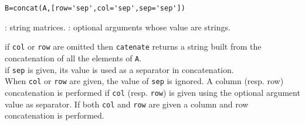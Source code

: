 
\begin{mandesc}
\end{mandesc}

\begin{calling_sequence}
\begin{verbatim}
B=concat(A,[row='sep',col='sep',sep='sep'])
\end{verbatim}
\end{calling_sequence}
\begin{parameters}
  \begin{varlist}
     : string matrices.
     : optional arguments whose value are strings.
  \end{varlist}
\end{parameters}

\begin{mandescription} 
  if \verb+col+ or \verb+row+ are omitted then \verb+catenate+
  returns a string built from the concatenation of all the 
  elements of \verb+A+. \\
  if \verb+sep+ is given, its value 
  is used as a separator in concatenation. \\
  When \verb+col+ or \verb+row+  are given, the value of \verb+sep+
  is ignored. A column (resp. row) concatenation is 
  performed if \verb+col+ (resp. \verb+row+) is given using the optional
  argument value as separator. If both \verb+col+ and \verb+row+ 
  are given a column and row concatenation is performed. 
\end{mandescription}
  
\begin{examples}
  \begin{program}
  \end{program}
\end{examples}

